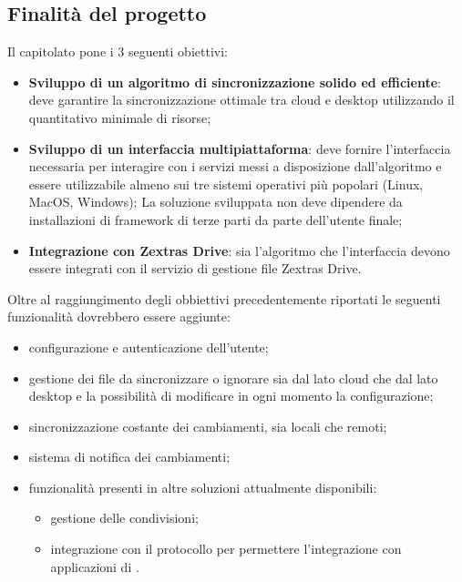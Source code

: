 \subsection{Finalità del progetto}
Il capitolato pone i 3 seguenti obiettivi:
\begin{itemize}
\item \textbf{Sviluppo di un algoritmo di sincronizzazione solido ed efficiente}: deve garantire la sincronizzazione ottimale tra cloud e desktop utilizzando il quantitativo minimale di risorse;
\item \textbf{Sviluppo di un interfaccia multipiattaforma}: deve fornire l'interfaccia necessaria per interagire con i servizi messi a disposizione 
dall'algoritmo e essere utilizzabile almeno sui tre sistemi operativi più popolari (Linux, MacOS, Windows);
La soluzione sviluppata non deve dipendere da installazioni di framework di terze parti da parte dell'utente finale;
\item \textbf{Integrazione con Zextras Drive}: sia l'algoritmo che l'interfaccia devono essere integrati con il servizio di gestione file Zextras Drive.
\end{itemize}
Oltre al raggiungimento degli obbiettivi precedentemente riportati le seguenti funzionalità dovrebbero essere aggiunte:
\begin{itemize}
\item configurazione e autenticazione dell'utente;
\item gestione dei file da sincronizzare o ignorare sia dal lato cloud che dal lato desktop e la possibilità di modificare in ogni momento la configurazione;
\item sincronizzazione costante dei cambiamenti, sia locali che remoti;
\item sistema di notifica dei cambiamenti;
\item funzionalità presenti in altre soluzioni attualmente disponibili:
    \begin{itemize}
    \item gestione delle condivisioni;
    \item integrazione con il protocollo  per permettere l'integrazione con applicazioni di .
    \end{itemize}
\end{itemize}

